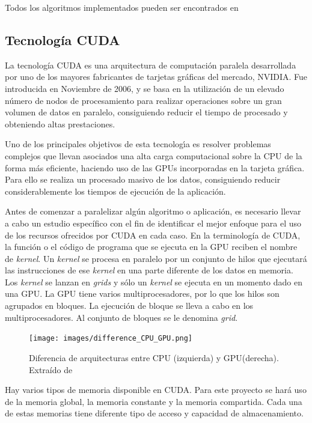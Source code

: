\documentclass[10pt,journal,compsoc]{IEEEtran}
\begin{document}
Todos los algoritmos implementados pueden ser encontrados en \cite{repo}


\subsection{Tecnología CUDA}

La tecnología CUDA es una arquitectura de computación paralela desarrollada por uno de
los mayores fabricantes de tarjetas gráficas del mercado, NVIDIA.
Fue introducida en Noviembre de 2006, y se basa en la utilización de un elevado número de
nodos de procesamiento para realizar operaciones sobre un gran volumen de datos en paralelo, consiguiendo reducir el tiempo de procesado y obteniendo altas prestaciones\cite{QECUDA}.

Uno de los principales objetivos de esta tecnologı́a es resolver problemas complejos que llevan asociados una alta carga computacional sobre la CPU de la forma más eficiente, haciendo uso de las GPUs incorporadas en la tarjeta gráfica. Para ello se realiza un procesado masivo de los datos, consiguiendo reducir considerablemente los tiempos de ejecución de la aplicación.

Antes de comenzar a paralelizar algún algoritmo o aplicación, es necesario llevar a cabo un estudio específico con el fin de identificar el mejor enfoque para el uso de los recursos ofrecidos por CUDA en cada caso. En la terminología de CUDA, la función o el código de programa que se ejecuta en la GPU reciben el nombre de \textit{kernel}. Un \textit{kernel} se procesa en paralelo por un conjunto de hilos que ejecutará las instrucciones de ese \textit{kernel} en una parte diferente de los datos en memoria. Los \textit{kernel} se lanzan en \textit{grids} y sólo un \textit{kernel} se ejecuta en un momento dado en una GPU. La GPU tiene varios multiprocesadores, por lo que los hilos son agrupados en bloques. La ejecución de bloque se lleva a cabo en los multiprocesadores. Al conjunto de bloques se le denomina \textit{grid}.

\begin{figure}
    \begin{center}
        \texttt{[image: images/difference\_CPU\_GPU.png]}
    \end{center}
    \caption{Diferencia de arquitecturas entre CPU (izquierda) y GPU(derecha). Extraído de \cite{kirk2016programming}}\label{}
\end{figure}

Hay varios tipos de memoria disponible en CUDA. Para  este proyecto se hará uso de la memoria global, la memoria constante y la memoria compartida. Cada una de estas memorias tiene diferente tipo de acceso y capacidad de almacenamiento.
\end{document}

